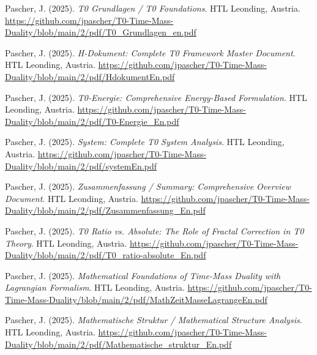 \documentclass{article}
\begin{document}
	\begin{thebibliography}{99}
		
		
		Pascher, J. (2025).
		\textit{T0 Grundlagen / T0 Foundations}.
		HTL Leonding, Austria.
		\url{https://github.com/jpascher/T0-Time-Mass-Duality/blob/main/2/pdf/T0_Grundlagen_en.pdf}
		
		Pascher, J. (2025).
		\textit{H-Dokument: Complete T0 Framework Master Document}.
		HTL Leonding, Austria.
		\url{https://github.com/jpascher/T0-Time-Mass-Duality/blob/main/2/pdf/HdokumentEn.pdf}
		
		Pascher, J. (2025).
		\textit{T0-Energie: Comprehensive Energy-Based Formulation}.
		HTL Leonding, Austria.
		\url{https://github.com/jpascher/T0-Time-Mass-Duality/blob/main/2/pdf/T0-Energie_En.pdf}
		
		Pascher, J. (2025).
		\textit{System: Complete T0 System Analysis}.
		HTL Leonding, Austria.
		\url{https://github.com/jpascher/T0-Time-Mass-Duality/blob/main/2/pdf/systemEn.pdf}
		
		Pascher, J. (2025).
		\textit{Zusammenfassung / Summary: Comprehensive Overview Document}.
		HTL Leonding, Austria.
		\url{https://github.com/jpascher/T0-Time-Mass-Duality/blob/main/2/pdf/Zusammenfassung_En.pdf}
		
		Pascher, J. (2025).
		\textit{T0 Ratio vs. Absolute: The Role of Fractal Correction in T0 Theory}.
		HTL Leonding, Austria.
		\url{https://github.com/jpascher/T0-Time-Mass-Duality/blob/main/2/pdf/T0_ratio-absolute_En.pdf}
		
		
		Pascher, J. (2025).
		\textit{Mathematical Foundations of Time-Mass Duality with Lagrangian Formalism}.
		HTL Leonding, Austria.
		\url{https://github.com/jpascher/T0-Time-Mass-Duality/blob/main/2/pdf/MathZeitMasseLagrangeEn.pdf}
		
		Pascher, J. (2025).
		\textit{Mathematische Struktur / Mathematical Structure Analysis}.
		HTL Leonding, Austria.
		\url{https://github.com/jpascher/T0-Time-Mass-Duality/blob/main/2/pdf/Mathematische_struktur_En.pdf}
		

\end{thebibliography}
\end{document}
